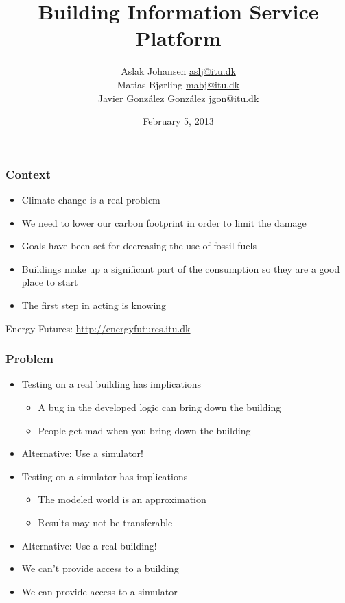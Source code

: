 \documentclass[t]{beamer}
\title{Building Information Service Platform\\\scalebox{0.85}{a Discrete Event Simulator for Building Modeling}}
\author{Aslak Johansen \url{aslj@itu.dk}\\Matias Bjørling \url{mabj@itu.dk}\\Javier González González \url{jgon@itu.dk}}
\date{February 5, 2013}
\begin{document}
\frame{\titlepage}

\begin{frame}
  \frametitle{Context}
  
  \begin{itemize}
    \item Climate change is a real problem
    \item We need to lower our carbon footprint in order to limit the damage
    \item Goals have been set for decreasing the use of fossil fuels
    \item Buildings make up a significant part of the consumption so they are a good place to start
    \item The first step in acting is knowing
  \end{itemize}
  
  Energy Futures: \url{http://energyfutures.itu.dk}
  
\end{frame}

\begin{frame}
  \frametitle{Problem}
  
  \begin{itemize}
    \item Testing on a real building has implications
      \begin{itemize}
        \item A bug in the developed logic can bring down the building
        \item People get mad when you bring down the building
      \end{itemize}
    \item Alternative: Use a simulator!
    \item Testing on a simulator has implications
      \begin{itemize}
        \item The modeled world is an approximation
        \item Results may not be transferable
      \end{itemize}
    \item Alternative: Use a real building!
  \end{itemize}
  
  \begin{itemize}
    \item We can't provide access to a building
    \item We can provide access to a simulator
  \end{itemize}
  
\end{frame}
\end{document}
